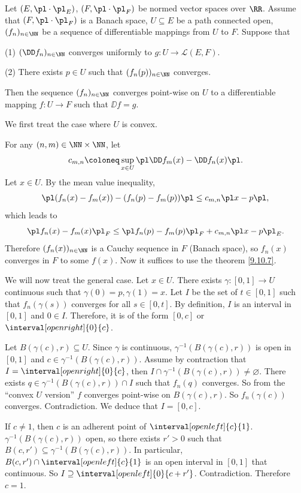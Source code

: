 \begin{propositionenv}
    Let $(E,\pl\cdot\pl_E)$, $(F,\pl\cdot\pl_F)$ be  normed vector spaces over $\RR$. Assume that $(F,\pl\cdot\pl_F)$ is a Banach space, $U\subseteq E$ be a path connected open, $(f_n)_{n\in\NN}$ be a sequence of differentiable mappings from $U$ to $F$. Suppose that 

    (1) $(\DD f_n)_{n\in\NN}$ converges uniformly to $g: U\longrightarrow \mathscr{L}(E,F)$.

    (2) There exists $p\in U$ such that $(f_n(p))_{n\in \NN}$ converges.

    Then the sequence $(f_n)_{n\in\NN}$ converges point-wise on $U$ to a differentiable mapping $f: U\longrightarrow F$ such that $\DD f=g$.
\end{propositionenv}
\begin{proofenv}
    We first treat the case where $U$ is convex.

    For any $(n,m)\in \NN\times \NN$, let 
    $$c_{m,n}\coloneq \sup_{x\in U}\pl \DD f_m(x)-\DD f_n(x)\pl.$$
    Let $x\in U$. By the mean value inequality,
    $$ \pl (f_n(x)-f_m(x))-(f_n(p)-f_m(p))\pl \le c_{m,n}\pl x-p\pl,$$
    which leads to
    $$ \pl f_n(x)- f_m(x)\pl_F\le \pl f_n(p)-f_m(p)\pl_F+c_{m,n}\pl x-p\pl_E.$$
    Therefore $(f_n(x))_{n\in \NN}$ is a Cauchy sequence in $F$ (Banach space), so $f_n(x)$ converges in $F$ to some $f(x)$. Now it suffices to use the theorem \ref{9.10.7}.
    
    We will now treat the general case. Let $x\in U$. There exists $\gamma:[0,1]\longrightarrow U$ continuous such that $\gamma(0)=p,\gamma(1)=x$. Let $I$  be the set of $t\in [0,1]$ such that $f_n(\gamma(s))$ converges for all $s\in [0,t]$. By definition, $I$ is an interval in $[0,1]$ and $0\in I$.
    Therefore, it is of the form $[0,c]$ or $\interval[open right]{0}{c}$.

    \quad Let $B(\gamma(c),r)\subseteq U$. Since $\gamma$ is continuous, $\gamma^{-1}(B(\gamma(c),r))$ is open in $[0,1]$ and $c\in \gamma^{-1}(B(\gamma(c),r))$. Assume by contraction that $I=\interval[open right]{0}{c}$, then $I\cap \gamma^{-1}(B(\gamma(c),r))\neq \varnothing$.
    There exists $q\in \gamma^{-1}(B(\gamma(c),r))\cap I$ such that $f_n(q)$ converges. So from the ``convex $U$ version'' $f$ converges point-wise on $B(\gamma(c),r)$.
    So $f_n(\gamma(c))$ converges. Contradiction. We deduce that $I=[0,c]$.

    \quad If $c\neq 1$, then $c$ is an adherent point of $\interval[open left]{c}{1}$.
    $\gamma^{-1}(B(\gamma(c),r))$ open, so there exists $r'>0$ such that $B(c,r')\subseteq \gamma^{-1}(B(\gamma(c),r))$. In particular, $B(c,r')\cap \interval[open left]{c}{1}$ is an open interval in $[0,1]$ that continuous.
    So $I\supseteq \interval[open left]{0}{c+r'}$. Contradiction. Therefore $c=1$.
\end{proofenv}

